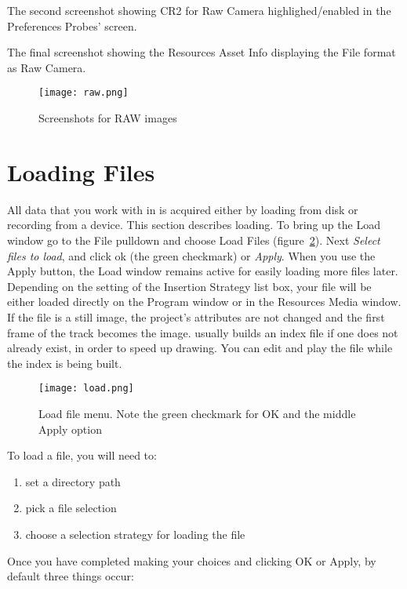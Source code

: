 The second screenshot showing CR2 for Raw Camera highlighed/enabled in the Preferences Probes’ screen.

The final screenshot showing the Resources Asset Info displaying the File format as Raw Camera.

\begin{figure}[htpb]
    \centering
    \texttt{[image: raw.png]}
    \caption{Screenshots for RAW images}
    \label{fig:raw}
\end{figure}

\section{Loading Files}%
\label{sec:loading_files}

All data that you work with in \CGG{} is acquired either by loading from disk or recording from a device. This section describes loading.  To bring up the Load window go to the File pulldown and choose Load Files  (figure~\ref{fig:load}).  Next \textit{Select files to load}, and click ok (the green checkmark) or \textit{Apply}. When you use the Apply button, the Load window remains active for easily loading more files later.  Depending on the setting of the Insertion Strategy list box, your file will be either loaded directly on the Program window or in the Resources Media window.  If the file is a still image, the project's attributes are not changed and the first frame of the track becomes the image. \CGG{} usually builds an index file if one does not already exist, in order to speed up drawing. You can edit and play the file while the index is being built.

\begin{figure}[htpb]
    \centering
    \texttt{[image: load.png]}
    \caption{Load file menu.  Note the green checkmark for OK and the middle Apply option}
    \label{fig:load}
\end{figure}

\vspace{1ex} \noindent To load a file, you will need to:

\begin{enumerate}
    \item set a directory path
    \item pick a file selection
    \item choose a selection strategy for loading the file
\end{enumerate}

\noindent Once you have completed making your choices and clicking OK or Apply, by default three things occur:

